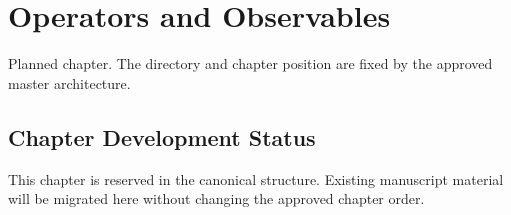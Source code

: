 \chapter{Operators and Observables}
\label{chap:19-operators-and-observables}

\begin{roadmapbox}
Planned chapter. The directory and chapter position are fixed by the approved master architecture.
\end{roadmapbox}

\section*{Chapter Development Status}
This chapter is reserved in the canonical structure. Existing manuscript material will be migrated here without changing the approved chapter order.

